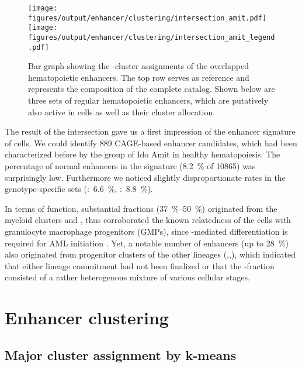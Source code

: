 \begin{figure}[!htb]
	\centering
	\texttt{[image: figures/output/enhancer/clustering/intersection\_amit.pdf]} 
	\texttt{[image: figures/output/enhancer/clustering/intersection\_amit\_legend.pdf]} 
	\caption{Bar graph showing the \hisfourone-cluster assignments of the overlapped hematopoietic enhancers. The top row serves as reference and represents the composition of the complete catalog. Shown below are three sets of regular hematopoietic enhancers, which are putatively also active in \mllafnine \kitpos cells as well as their cluster allocation.}
	\label{fig:enhancers:intersection_amit_clusters}
\end{figure}

The result of the intersection gave us a first impression of the enhancer signature of \kitpos cells. We could identify \num{889} CAGE-based enhancer candidates, which had been characterized before by the group of Ido Amit in healthy hematopoiesis. The percentage of normal enhancers in the signature (\SI{8.2}{\percent} of \num{10865}) was surprisingly low. Furthermore we noticed slightly disproportionate rates in the genotype-specific sets (\dnmtwt:~\SI{6.6}{\percent}, \dnmtchip:~\SI{8.8}{\percent}). 

In terms of function, substantial fractions (\SIrange{37}{50}{\percent}) originated from the myeloid clusters \amittwo and \amitsix {}, thus corroborated the known relatedness of the \mllafnine \lsk cells with granulocyte macrophage progenitors (GMPs), since \tfcebpa -mediated differentiation is required for AML initiation \cite{Ye2015}. Yet, a notable number of enhancers (up to \SI{28}{\percent}) also originated from progenitor clusters of the other lineages (,,), which indicated that either lineage commitment had not been finalized or that the \kitpos-fraction consisted of a rather heterogenous mixture of various cellular stages. 

\section{Enhancer clustering}
\label{chap:r:enhancers:cluster}

\subsection{Major cluster assignment by k-means}
\label{chap:r:enhancers:cluster:kmeans}

